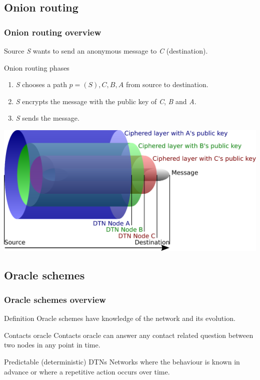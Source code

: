 \documentclass[compress,red]{beamer}
\begin{document}
\subsection{Onion routing}
\begin{frame}
\frametitle{Onion routing overview}
Source \textit{S} wants to send an anonymous message to \textit{C} (destination).
\bigskip
\begin{block}{Onion routing phases}
\begin{enumerate}
\item \textit{S} chooses a path $p=(S),C,B,A$ from source to destination.
\item \textit{S} encrypts the message with the public key of \textit{C}, \textit{B} and \textit{A}.
\item \textit{S} sends the message.
\end{enumerate}
\end{block}
\bigskip
\centering \includegraphics[width=.7\linewidth]{../paper/imgs/onion}
\end{frame}

\subsection{Oracle schemes}
\begin{frame}
\frametitle{Oracle schemes overview}
\begin{block}{Definition}
Oracle schemes have knowledge of the network and its evolution.
\end{block}
\bigskip
\begin{block}{Contacts oracle}
Contacts oracle can answer any contact related question between two nodes in any point in time.
\end{block}
\bigskip
\begin{block}{Predictable (deterministic) DTNs}
Networks where the behaviour is known in advance or where a repetitive action occurs over time.
\end{block}
\end{frame}
\end{document}
